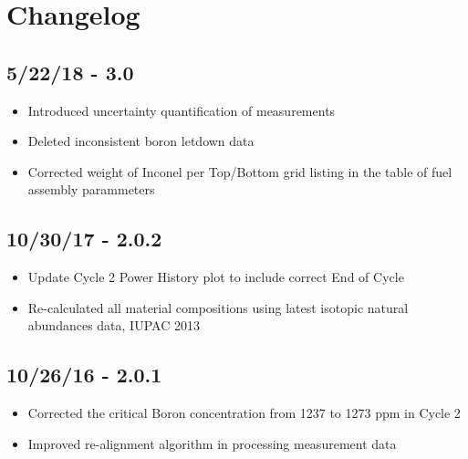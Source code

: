 \section*{Changelog}

\subsection*{5/22/18 - 3.0}
\begin{itemize}
  \item Introduced uncertainty quantification of measurements
  \item Deleted inconsistent boron letdown data
  \item Corrected weight of Inconel per Top/Bottom grid listing in the table of
        fuel assembly parammeters
\end{itemize}

\subsection*{10/30/17 - 2.0.2}
\begin{itemize}
  \item Update Cycle 2 Power History plot to include correct End of Cycle
  \item Re-calculated all material compositions using latest isotopic natural
        abundances data, IUPAC 2013
\end{itemize}

\subsection*{10/26/16 - 2.0.1}
\begin{itemize}
  \item Corrected the critical Boron concentration from 1237 to 1273 ppm in Cycle 2
  \item Improved re-alignment algorithm in processing measurement data
\end{itemize}


